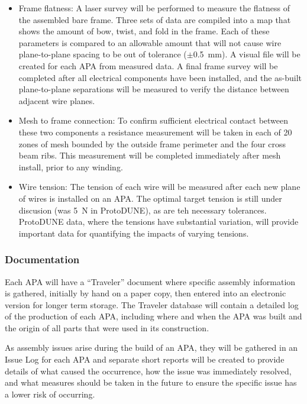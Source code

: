 \begin{itemize}

\item Frame flatness: A laser survey will be performed to measure the flatness of the assembled bare frame. Three sets of data are compiled into a map that shows the amount of bow, twist, and fold in the frame. Each of these parameters is compared to an allowable amount that will not cause wire plane-to-plane spacing to be out of tolerance ($\pm$\SI{0.5}{mm}).  A visual file will be created for each APA from measured data. A final frame survey will be completed after all electrical components have been installed, and the as-built plane-to-plane separations will be measured to verify the distance between adjacent wire planes.

\item Mesh to frame connection: To confirm sufficient electrical contact between these two components a resistance measurement will be taken in each of 20 zones of mesh bounded by the outside frame perimeter and the four cross beam ribs. This measurement will be completed immediately after mesh install, prior to any winding.

\item Wire tension: The tension of each wire will be measured after each new plane of wires is installed on an APA. The optimal target tension is still under discusion (was \SI{5}{N} in ProtoDUNE), as are teh necessary tolerances.  ProtoDUNE data, where the tensions have substantial variation, will provide important data for quantifying the impacts of varying tensions.  

\end{itemize}


\subsubsection{Documentation} 

Each APA will have a ``Traveler'' document where specific assembly information is gathered, initially by hand on a paper copy, then entered into an electronic version for longer term storage.  The Traveler database will contain a detailed log of the production of each APA, including where and when the APA was built and the origin of all parts that were used in its construction. 

As assembly issues arise during the build of an APA, they will be gathered in an Issue Log for each APA and separate short reports will be created to provide details of what caused the occurrence, how the issue was immediately resolved, and what measures should be taken in the future to ensure the specific issue has a lower risk of occurring.  




